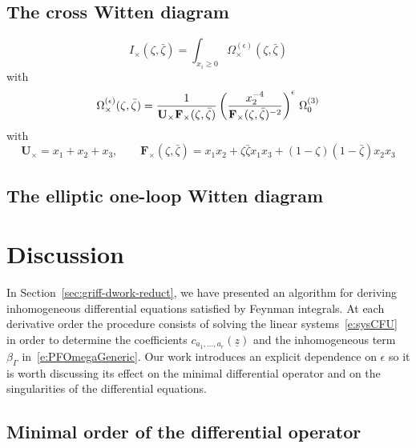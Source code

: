\documentclass[a4paper,12pt]{article}
\numberwithin{equation}{section}
\numberwithin{figure}{section}
\begin{document}
\subsection{The cross Witten diagram}

\begin{equation}
  I_\times(\zeta,\bar\zeta)= \int_{x_i\geq0}   \Omega_\times^{(\epsilon)}(\zeta,\bar\zeta)
\end{equation}
with
\begin{equation}
  \Omega_\times^{(\epsilon)}(\zeta,\bar\zeta)= {1\over \textbf{U}_\times
    \textbf{F}_\times (\zeta,\bar\zeta)} \left( x_2^{-4}\over
    \textbf{F}_\times (\zeta,\bar\zeta)^{-2}\right)^\epsilon  \, \Omega_0^{(3)}
\end{equation}
with
\begin{equation}
  \textbf{U}_\times= x_1+x_2+x_3,  \qquad \textbf{F}_\times (\zeta,\bar\zeta)= x_1x_2+
  \zeta\bar\zeta x_1x_3+ (1-\zeta)(1-\bar\zeta)x_2x_3  
\end{equation}

\subsection{The elliptic one-loop Witten diagram}



\section{Discussion}
%
In Section~\ref{sec:griff-dwork-reduct}, we have presented an
algorithm for deriving inhomogeneous differential equations satisfied by Feynman
integrals. At each derivative order the
 procedure consists of solving the linear systems~\eqref{e:sysCFU} in order to
determine the coefficients $c_{a_1,\dots,a_r}(\underline z)$ and the 
inhomogeneous term $\beta_\Gamma$ in~\eqref{e:PFOmegaGeneric}. Our work introduces an explicit dependence on $\epsilon$ so it is worth discussing  its effect on the minimal differential
operator and on the singularities of the differential equations.
%
%

\subsection{Minimal order of the differential operator}
\label{sec:minim-order-diff}
\end{document}
